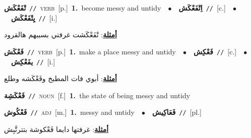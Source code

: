 \documentclass[10pt,a4paper,twoside]{article} %
\begin{document}
\begin{multicols}{2}
{\setlength\topsep{0pt}\textbf{\foreignlanguage{arabic}{تْفَعْكَش}}\ {\color{gray}\texttt{//}\color{black}}\ \textsc{verb}\ [p.]\ \textbf{1.}~become messy and untidy\ \ $\bullet$\ \ \setlength\topsep{0pt}\textbf{\foreignlanguage{arabic}{اِتْفَعْكَش}}\ {\color{gray}\texttt{//}\color{black}}\ [c.]\ \ $\bullet$\ \ \setlength\topsep{0pt}\textbf{\foreignlanguage{arabic}{يِتْفَعْكَش}}\ {\color{gray}\texttt{//}\color{black}}\ [i.]\  \begin{flushright}\color{gray}\foreignlanguage{arabic}{\textbf{\underline{\foreignlanguage{arabic}{أمثلة}}}: تْفَعْكَشت غرفتي بسببهم هالقرود}\end{flushright}\color{black}} \vspace{2mm}

{\setlength\topsep{0pt}\textbf{\foreignlanguage{arabic}{فَعْكَش}}\ {\color{gray}\texttt{//}\color{black}}\ \textsc{verb}\ [p.]\ \textbf{1.}~make a place messy and untidy\ \ $\bullet$\ \ \setlength\topsep{0pt}\textbf{\foreignlanguage{arabic}{فَعْكِش}}\ {\color{gray}\texttt{//}\color{black}}\ [c.]\ \ $\bullet$\ \ \setlength\topsep{0pt}\textbf{\foreignlanguage{arabic}{يفَعْكِش}}\ {\color{gray}\texttt{//}\color{black}}\ [i.]\  \begin{flushright}\color{gray}\foreignlanguage{arabic}{\textbf{\underline{\foreignlanguage{arabic}{أمثلة}}}: أبوي فات المطبخ وفَعْكَشه وطلع}\end{flushright}\color{black}} \vspace{2mm}

{\setlength\topsep{0pt}\textbf{\foreignlanguage{arabic}{فَعْكَشِة}}\ {\color{gray}\texttt{//}\color{black}}\ \textsc{noun}\ [f.]\ \textbf{1.}~the state of being messy and untidy\ } \vspace{2mm}

{\setlength\topsep{0pt}\textbf{\foreignlanguage{arabic}{فَعْكُوش}}\ {\color{gray}\texttt{//}\color{black}}\ \textsc{adj}\ [m.]\ \textbf{1.}~messy and untidy\ \ $\bullet$\ \ \setlength\topsep{0pt}\textbf{\foreignlanguage{arabic}{فَعَاكِيش}}\ {\color{gray}\texttt{//}\color{black}}\ [pl.]\  \begin{flushright}\color{gray}\foreignlanguage{arabic}{\textbf{\underline{\foreignlanguage{arabic}{أمثلة}}}: غرفتها دايما فَعْكوشة بتترتَّبِش}\end{flushright}\color{black}} \vspace{2mm}


\end{multicols}
\end{document}
